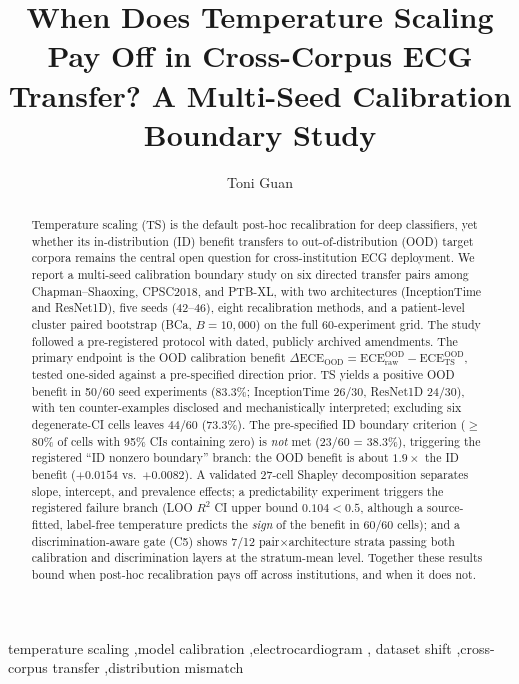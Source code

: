 \documentclass[review,12pt,nonatbib]{elsarticle}
\title{When Does Temperature Scaling Pay Off in Cross-Corpus ECG Transfer? A Multi-Seed Calibration Boundary Study}
\author[inst1]{Toni Guan\corref{cor1}}
\affiliation[inst1]{organization={College of Information Technology, Shenyang Institute of Technology},
  city={Shenyang}, state={Liaoning}, country={China}}
\begin{document}
\linenumbers
\begin{frontmatter}

\begin{abstract}
Temperature scaling (TS) is the default post-hoc recalibration for deep
classifiers, yet whether its in-distribution (ID) benefit transfers to
out-of-distribution (OOD) target corpora remains the central open question
for cross-institution ECG deployment. We report a multi-seed calibration
boundary study on six directed transfer pairs among Chapman--Shaoxing,
CPSC2018, and PTB-XL, with two architectures (InceptionTime and
ResNet1D), five seeds (42--46), eight recalibration methods, and a
patient-level cluster paired bootstrap (BCa, $B=10{,}000$) on the full
60-experiment grid. The study followed a pre-registered protocol with dated,
publicly archived amendments. The primary endpoint is the OOD calibration
benefit $\Delta\text{ECE}_{\text{OOD}}=\text{ECE}_{\mathrm{raw}}^{\mathrm{OOD}}
-\text{ECE}_{\mathrm{TS}}^{\mathrm{OOD}}$, tested one-sided against a
pre-specified direction prior. TS yields a positive OOD benefit in 50/60 seed
experiments (83.3\%; InceptionTime 26/30, ResNet1D 24/30), with ten
counter-examples disclosed and mechanistically interpreted; excluding six
degenerate-CI cells leaves 44/60 (73.3\%). The pre-specified ID boundary
criterion ($\geq$80\% of cells with 95\% CIs containing zero) is
\emph{not} met (23/60 = 38.3\%), triggering the registered ``ID nonzero
boundary'' branch: the OOD benefit is about $1.9\times$ the ID benefit
($+0.0154$ vs.\ $+0.0082$). A validated 27-cell Shapley decomposition
separates slope, intercept, and prevalence effects; a predictability
experiment triggers the registered failure branch (LOO $R^2$ CI upper bound
$0.104<0.5$, although a source-fitted, label-free temperature predicts the
\emph{sign} of the benefit in 60/60 cells); and a discrimination-aware gate
(C5) shows 7/12
pair$\times$architecture strata passing both calibration and discrimination
layers at the stratum-mean level. Together these results bound when post-hoc recalibration pays off
across institutions, and when it does not.
\end{abstract}

\begin{keyword}
temperature scaling \sep model calibration \sep electrocardiogram \sep
dataset shift \sep cross-corpus transfer \sep distribution mismatch
\end{keyword}

\end{frontmatter}
\end{document}

